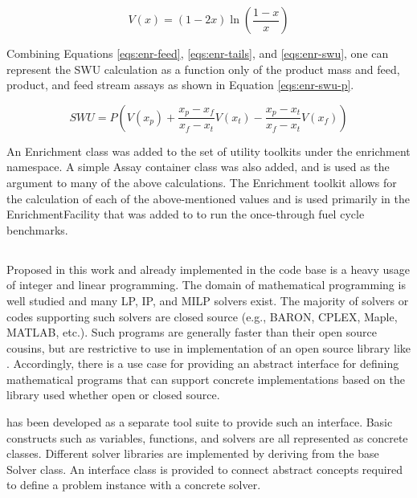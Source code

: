 \begin{equation}\label{eqs:enr-value}
  V(x) = (1 - 2x) \ln \left( \frac{1-x}{x} \right)
\end{equation}

Combining Equations \ref{eqs:enr-feed}, \ref{eqs:enr-tails}, and
\ref{eqs:enr-swu}, one can represent the SWU calculation as a function only of
the product mass and feed, product, and feed stream assays as shown in
Equation \ref{eqs:enr-swu-p}.

\begin{equation}\label{eqs:enr-swu-p}
  SWU = P \left( V(x_{p}) + \frac{x_{p} - x_{f}}{x_{f} - x_{t}} V(x_{t}) 
        - \frac{x_{p} - x_{t}}{x_{f} - x_{t}} V(x_{f}) \right)
\end{equation}

An Enrichment class was added to the \Cyclus set of utility toolkits under the
enrichment namespace. A simple Assay container class was also added, and is used
as the argument to many of the above calculations. The Enrichment toolkit allows
for the calculation of each of the above-mentioned values and is used primarily
in the EnrichmentFacility that was added to \Cycamore to run the once-through
fuel cycle benchmarks.

\subsection{\Cyclopts}

Proposed in this work and already implemented in the \Cyclus code base is a
heavy usage of integer and linear programming. The domain of mathematical
programming is well studied and many LP, IP, and MILP solvers exist. The
majority of solvers or codes supporting such solvers are closed source (e.g.,
BARON, CPLEX, Maple, MATLAB, etc.). Such programs are generally faster than
their open source cousins, but are restrictive to use in implementation of an
open source library like \Cyclus. Accordingly, there is a use case for providing
an abstract interface for defining mathematical programs that can support
concrete implementations based on the library used whether open or closed
source.

\Cyclopts has been developed as a separate tool suite to provide such an
interface. Basic constructs such as variables, functions, and solvers are all
represented as concrete classes. Different solver libraries are implemented by
deriving from the base Solver class. An interface class is provided to connect
abstract concepts required to define a problem instance with a concrete solver.

